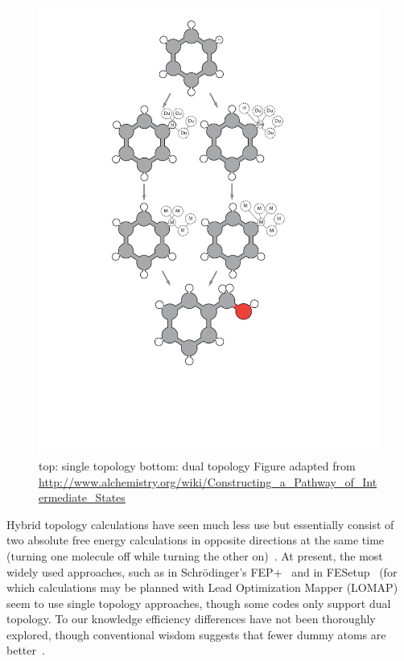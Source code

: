 \documentclass[9pt,bestpractices]{livecoms}
\begin{document}
\begin{figure}[h!]
    \includegraphics[width=0.95\columnwidth]{figures/fig3_topol/Figure.pdf}
    \caption{top: single topology bottom: dual topology Figure adapted from \url{http://www.alchemistry.org/wiki/Constructing_a_Pathway_of_Intermediate_States}}
    \label{fig:fig_topology}
\end{figure} 
Hybrid topology calculations have seen much less use but essentially consist of two absolute free energy calculations in opposite directions at the same time (turning one molecule off while turning the other on)~\cite{jiang2019computing}.
At present, the most widely used approaches, such as in Schr\"{o}dinger's FEP+~\cite{wang2019protein} and in FESetup~\cite{loeffler2015fesetup} (for which calculations may be planned with Lead Optimization Mapper (LOMAP)~\cite{liu2013lead} seem to use single topology approaches, though some codes only support dual topology.
To our knowledge efficiency differences have not been thoroughly explored, though conventional wisdom suggests that fewer dummy atoms are better~\cite{liu2013lead,mobley2012perspective}.
\end{document}
